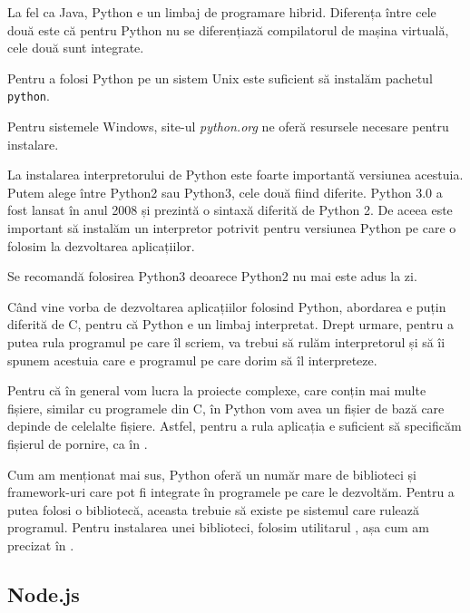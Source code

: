 La fel ca Java, Python e un limbaj de programare hibrid. Diferența între cele
două este că pentru Python nu se diferențiază compilatorul de mașina virtuală,
cele două sunt integrate.

Pentru a folosi Python pe un sistem Unix este suficient să instalăm pachetul \texttt{python}.

Pentru sistemele Windows, site-ul \textit{python.org} ne oferă resursele
necesare pentru instalare.

La instalarea interpretorului de Python este foarte importantă versiunea
acestuia. Putem alege între Python2 sau Python3, cele două fiind diferite.
Python 3.0 a fost lansat în anul 2008 și prezintă o sintaxă diferită de Python
2. De aceea este important să instalăm un interpretor potrivit pentru versiunea
Python pe care o folosim la dezvoltarea aplicațiilor.

Se recomandă folosirea Python3 deoarece Python2 nu mai este adus la zi.

Când vine vorba de dezvoltarea aplicațiilor folosind Python, abordarea e puțin
diferită de C, pentru că Python e un limbaj interpretat. Drept urmare, pentru a
putea rula programul pe care îl scriem, va trebui să rulăm interpretorul și să
îi spunem acestuia care e programul pe care dorim să îl interpreteze.

Pentru că în general vom lucra la proiecte complexe, care conțin mai multe
fișiere, similar cu programele din C, în Python vom avea un fișier de bază care
depinde de celelalte fișiere. Astfel, pentru a rula aplicația e suficient să
specificăm fișierul de pornire, ca în .


Cum am menționat mai sus, Python oferă un număr mare de biblioteci și
framework-uri care pot fi integrate în programele pe care le dezvoltăm. Pentru a
putea folosi o bibliotecă, aceasta trebuie să existe pe sistemul care rulează
programul. Pentru instalarea unei biblioteci, folosim utilitarul , așa cum am precizat în .

\subsection{Node.js}
\label{sec:appdev:dev-env:js}

